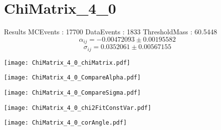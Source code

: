 \documentclass[a4paper,12pt]{article}
\begin{document}
\section{ChiMatrix\_4\_0}
\begin{minipage}{0.49\linewidth} Results \newline
MCEvents : 17700\newline
DataEvents : 1833 \newline
ThresholdMass : 60.5448\\
$$\alpha_{ij} = -0.00472093\pm 0.00195582$$
$$\sigma_{ij} = 0.0352061\pm 0.00567155$$
\end{minipage}\hfill
\begin{minipage}{0.49\linewidth} 
\texttt{[image: ChiMatrix\_4\_0\_chiMatrix.pdf]}\\
\end{minipage}
\hfill
\begin{minipage}{0.49\linewidth} 
\texttt{[image: ChiMatrix\_4\_0\_CompareAlpha.pdf]}\\
\end{minipage}
\hfill
\begin{minipage}{0.49\linewidth} 
\texttt{[image: ChiMatrix\_4\_0\_CompareSigma.pdf]}\\
\end{minipage}
\begin{minipage}{0.49\linewidth} 
\texttt{[image: ChiMatrix\_4\_0\_chi2FitConstVar.pdf]}\\
\end{minipage}
\hfill
\begin{minipage}{0.49\linewidth} 
\texttt{[image: ChiMatrix\_4\_0\_corAngle.pdf]}\\
\end{minipage}
\end{document}
